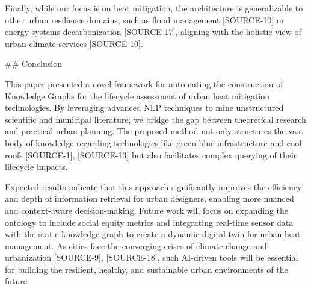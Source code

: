 \documentclass{article}
\begin{document}
Finally, while our focus is on heat mitigation, the architecture is generalizable to other urban resilience domains, such as flood management [SOURCE-10] or energy systems decarbonization [SOURCE-17], aligning with the holistic view of urban climate services [SOURCE-10].

\#\# Conclusion

This paper presented a novel framework for automating the construction of Knowledge Graphs for the lifecycle assessment of urban heat mitigation technologies. By leveraging advanced NLP techniques to mine unstructured scientific and municipal literature, we bridge the gap between theoretical research and practical urban planning. The proposed method not only structures the vast body of knowledge regarding technologies like green-blue infrastructure and cool roofs [SOURCE-1], [SOURCE-13] but also facilitates complex querying of their lifecycle impacts.

Expected results indicate that this approach significantly improves the efficiency and depth of information retrieval for urban designers, enabling more nuanced and context-aware decision-making. Future work will focus on expanding the ontology to include social equity metrics and integrating real-time sensor data with the static knowledge graph to create a dynamic digital twin for urban heat management. As cities face the converging crises of climate change and urbanization [SOURCE-9], [SOURCE-18], such AI-driven tools will be essential for building the resilient, healthy, and sustainable urban environments of the future.
\end{document}
